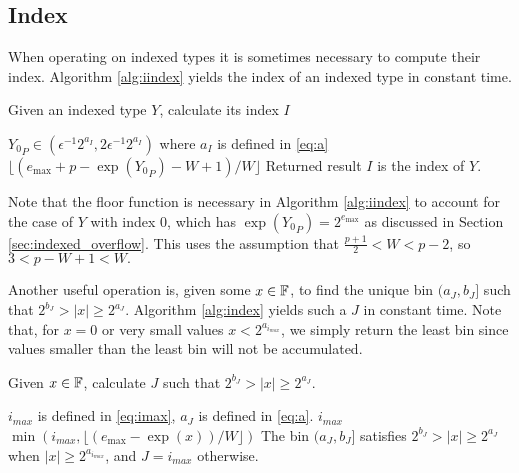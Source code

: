   \subsection{Index}
    \label{sec:primitiveops_index}
    When operating on indexed types it is sometimes necessary to compute their
    index. Algorithm \ref{alg:iindex} yields the index of an indexed type in
    constant time.

    \begin{samepage}
    \begin{alg}
      Given an indexed type $Y$, calculate its index $I$
      \begin{algorithmic}[1]
        \Require
          \Statex ${Y_0}_P \in (\epsilon^{-1}  2^{a_{I}}, 2  \epsilon^{-1}  2^{a_I})$
          where $a_I$ is defined in \eqref{eq:a}
          \State \Return $\lfloor(e_{\max} + p - \exp({Y_0}_P) - W + 1)/W\rfloor$
        \EndFunction
        \Ensure
          \Statex Returned result $I$ is the index of $Y$.
      \end{algorithmic}
      \label{alg:iindex}
    \end{alg}
    \end{samepage}

    Note that the floor function is necessary in Algorithm \ref{alg:iindex} to
    account for the case of $Y$ with index $0$, which has $\exp({Y_0}_P) =
    2^{e_{\max}}$ as discussed in Section \ref{sec:indexed_overflow}.  This
    uses the assumption that $\frac{p+1}{2} < W < p-2$, so $3 < p - W + 1 < W.$

    Another useful operation is, given some $x \in \mathbb{F}$, to find the unique bin
    $(a_J, b_J]$ such that $2^{b_J} > |x| \geq 2^{a_J}$. Algorithm
    \ref{alg:index} yields such a $J$ in constant time.
    Note that, for $x=0$ or very small values $x < 2^{a_{i_{max}}}$,
    we simply return the least bin
    since values smaller than the least bin will not be accumulated.

    \begin{samepage}
    \begin{alg}
      Given $x \in \mathbb{F}$, calculate $J$ such that $2^{b_J} > |x| \geq 2^{a_J}$.
      \begin{algorithmic}[1]
        \Require $i_{max}$ is defined in \eqref{eq:imax},
          $a_J$ is defined in \eqref{eq:a}.
           \State \Return $i_{max}$ \EndIf
          \State \Return $\min(i_{max}, \lfloor(e_{\max} - \exp(x))/W\rfloor)$
        \EndFunction
        \Ensure
          \Statex The bin $(a_{J}, b_{J}]$ satisfies $2^{b_{J}} > |x| \geq 2^{a_{J}}$ when
          $|x| \geq 2^{a_{i_{max}}}$, and $J=i_{max}$ otherwise.
      \end{algorithmic}
      \label{alg:index}
    \end{alg}
     \end{samepage}
